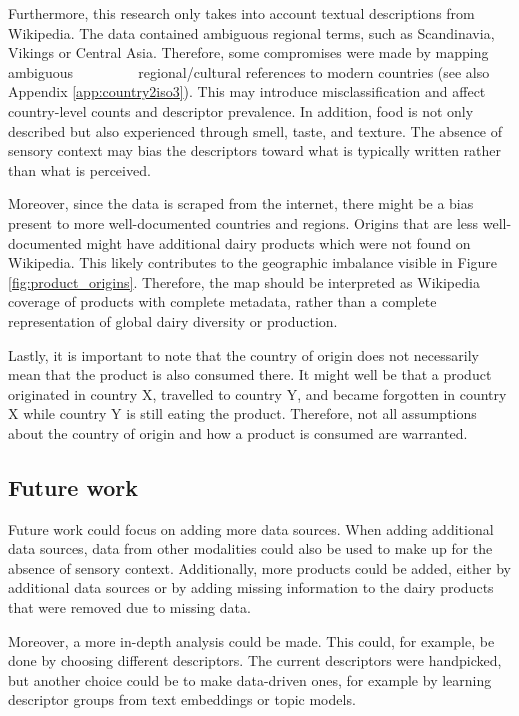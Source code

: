 \documentclass[sigconf]{acmart-txmm}
\begin{document}
Furthermore, this research only takes into account textual descriptions from Wikipedia.
The data contained ambiguous regional terms, such as Scandinavia, Vikings or Central Asia.
Therefore, some compromises were made by mapping ambiguous $\qquad\qquad$ regional/cultural references to modern countries (see also Appendix \ref{app:country2iso3}). 
This may introduce misclassification and affect country-level counts and descriptor prevalence.
In addition, food is not only described but also experienced through smell, taste, and texture.
The absence of sensory context may bias the descriptors toward what is typically written rather than what is perceived.

Moreover, since the data is scraped from the internet, there might be a bias present to more well-documented countries and regions. 
Origins that are less well-documented might have additional dairy products which were not found on Wikipedia. 
This likely contributes to the geographic imbalance visible in Figure \ref{fig:product_origins}.
Therefore, the map should be interpreted as Wikipedia coverage of products with complete metadata, rather than a complete representation of global dairy diversity or production.

Lastly, it is important to note that the country of origin does not necessarily mean that the product is also consumed there. 
It might well be that a product originated in country X, travelled to country Y, and became forgotten in country X while country Y is still eating the product.
Therefore, not all assumptions about the country of origin and how a product is consumed are warranted.

\subsection{Future work}
Future work could focus on adding more data sources. 
When adding additional data sources, data from other modalities could also be used to make up for the absence of sensory context.
Additionally, more products could be added, either by additional data sources or by adding missing information to the dairy products that were removed due to missing data.

Moreover, a more in-depth analysis could be made. 
This could, for example, be done by choosing different descriptors. 
The current descriptors were handpicked, but another choice could be to make data-driven ones, for example by learning descriptor groups from text embeddings or topic models. 
\end{document}
